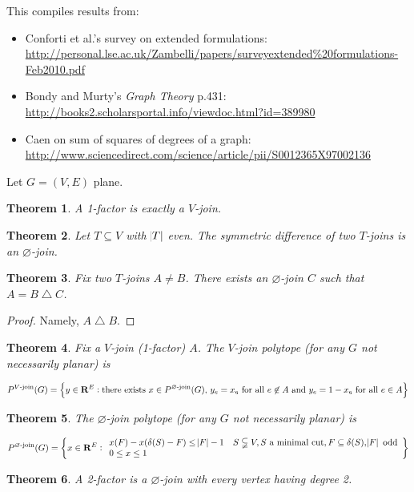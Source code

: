 \documentclass{article}
\newtheorem{theorem}{Theorem}
\begin{document}
This compiles results from:
\begin{itemize}
\item Conforti et al.'s survey on extended formulations: \url{http://personal.lse.ac.uk/Zambelli/papers/surveyextended\%20formulations-Feb2010.pdf}
\item Bondy and Murty's \emph{Graph Theory} p.431: \url{http://books2.scholarsportal.info/viewdoc.html?id=389980}
\item Caen on sum of squares of degrees of a graph: \url{http://www.sciencedirect.com/science/article/pii/S0012365X97002136}
\end{itemize}

Let $G=(V,E)$ plane.

\begin{theorem}
A 1-factor is exactly a $V$-join.
\end{theorem}
\begin{theorem}
Let $T\subseteq V$ with $\abs{T}$ even. The symmetric difference of two $T$-joins is an $\varnothing$-join.
\end{theorem}
\begin{theorem}
Fix two $T$-joins $A\neq B$. There exists an $\varnothing$-join $C$ such that $A = B\bigtriangleup C$.
\end{theorem}
\begin{proof}
Namely, $A\bigtriangleup B$.
\end{proof}

\begin{theorem}
Fix a $V$-join (1-factor) $A$. The $V$-join polytope (for any $G$ not necessarily planar) is

$$P^{\text{$V$-join}}(G) = \cbr{y\in \mathbf{R}^E: \text{there exists $x\in P^{\text{$\varnothing$-join}}(G)$, $y_e = x_e$ for all $e\not\in A$ and $y_e=1-x_e$ for all $e\in A$}}$$
\end{theorem}

\begin{theorem}
The $\varnothing$-join polytope (for any $G$ not necessarily planar) is

$$P^{\text{$\varnothing$-join}}(G) = \cbr{x\in\mathbf{R}^E: \begin{array}{ll}
x(F)-x(\delta(S)-F) \leq \abs{F}-1 & S\subsetneqq V, \text{$S$ a minimal cut}, F\subseteq \delta(S), \abs{F}\text{ odd} \\
0\leq x\leq 1 &
\end{array}}$$
\end{theorem}

\begin{theorem}
A 2-factor is a $\varnothing$-join with every vertex having degree 2.
\end{theorem}
\end{document}
